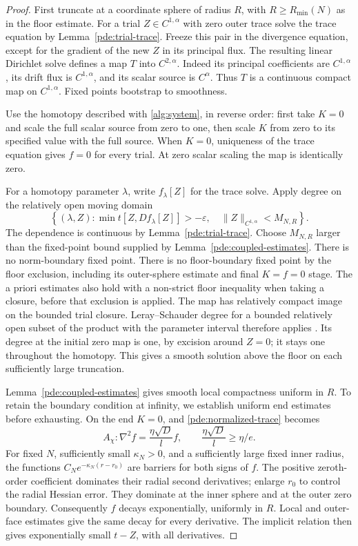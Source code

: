 \begin{proof}
First truncate at a coordinate sphere of radius \(R\), with
\(R\ge R_{\min}(N)\) as in the floor estimate.  For a trial
\(Z\in C^{1,\alpha}\) with zero outer trace solve the trace equation
by Lemma~\ref{pde:trial-trace}.  Freeze this pair in the divergence
equation, except for the gradient of the new \(Z\) in its principal
flux.  The resulting linear Dirichlet solve defines a map \(T\)
into \(C^{2,\alpha}\).  Indeed its principal coefficients are
\(C^{1,\alpha}\), its drift flux is \(C^{1,\alpha}\), and its
scalar source is \(C^\alpha\).  Thus \(T\) is a continuous compact
map on \(C^{1,\alpha}\).  Fixed points bootstrap to smoothness.

Use the homotopy described with \eqref{alg:system}, in reverse order:
first take \(K=0\) and scale the full scalar source from zero to one,
then scale \(K\) from zero to its specified value with the full source.
When \(K=0\), uniqueness of the trace equation gives \(f=0\) for
every trial.  At zero scalar scaling the map is identically zero.

For a homotopy parameter \(\lambda\), write \(f_\lambda[Z]\) for
the trace solve.  Apply degree on the relatively open moving domain
\[
 \left\{(\lambda,Z):
   \min t[Z,Df_\lambda[Z]]>-\varepsilon,\quad
   \|Z\|_{C^{1,\alpha}}<M_{N,R}\right\}.
\]
The dependence is continuous by Lemma~\ref{pde:trial-trace}.
Choose \(M_{N,R}\) larger than the fixed-point bound supplied by
Lemma~\ref{pde:coupled-estimates}.  There is no norm-boundary fixed
point.  There is no floor-boundary fixed point by the floor exclusion,
including its outer-sphere estimate and final \(K=f=0\) stage.
The a priori estimates also hold with a non-strict floor inequality
when taking a closure, before that exclusion is applied.
The map has relatively compact image on the bounded trial closure.
Leray--Schauder degree for a bounded relatively open subset of the
product with the parameter interval therefore applies
\cite[Sections~12--13]{LeraySchauder1934}.  Its degree at the initial
zero map is one, by excision around \(Z=0\); it stays one throughout
the homotopy.  This gives a smooth solution above the floor on each
sufficiently large truncation.

Lemma~\ref{pde:coupled-estimates} gives smooth local compactness
uniform in \(R\).  To retain the boundary condition at infinity,
we establish uniform end estimates before exhausting.
On the end \(K=0\), and \eqref{pde:normalized-trace} becomes
\[
 A_\chi:\nabla^2f=\frac{\eta\sqrt D}{l}f,\qquad
 \frac{\eta\sqrt D}{l}\ge\eta/e.
\]
For fixed \(N\), sufficiently small \(\kappa_N>0\), and a sufficiently
large fixed inner radius, the functions
\(C_Ne^{-\kappa_N(r-r_0)}\) are barriers for both signs of \(f\).
The positive zeroth-order coefficient dominates their radial second
derivatives; enlarge \(r_0\) to control the radial Hessian error.
They dominate at the inner sphere and at the outer zero boundary.
Consequently \(f\) decays exponentially, uniformly in \(R\).
Local and outer-face estimates give the same decay for every derivative.
The implicit relation then gives exponentially small \(t-Z\), with
all derivatives.


\end{proof}
